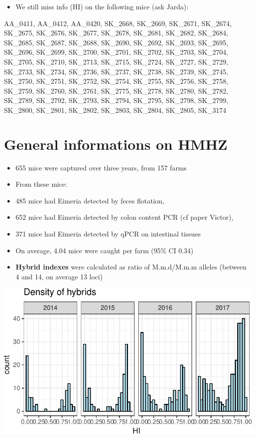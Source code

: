 \documentclass[]{article}
\providecommand{\tightlist}{%
  \setlength{\itemsep}{0pt}\setlength{\parskip}{0pt}}
\let\origfigure\figure
\let\endorigfigure\endfigure
\renewenvironment{figure}[1][2] { 
    \expandafter\origfigure\expandafter[H] 
} { 
    \endorigfigure 
}
\begin{document}
\begin{itemize}
\tightlist
\item
  We still miss info (HI) on the following mice (ask Jarda):
\end{itemize}

AA\_0411, AA\_0412, AA\_0420, SK\_2668, SK\_2669, SK\_2671, SK\_2674,
SK\_2675, SK\_2676, SK\_2677, SK\_2678, SK\_2681, SK\_2682, SK\_2684,
SK\_2685, SK\_2687, SK\_2688, SK\_2690, SK\_2692, SK\_2693, SK\_2695,
SK\_2696, SK\_2699, SK\_2700, SK\_2701, SK\_2702, SK\_2703, SK\_2704,
SK\_2705, SK\_2710, SK\_2713, SK\_2715, SK\_2724, SK\_2727, SK\_2729,
SK\_2733, SK\_2734, SK\_2736, SK\_2737, SK\_2738, SK\_2739, SK\_2745,
SK\_2750, SK\_2751, SK\_2752, SK\_2754, SK\_2755, SK\_2756, SK\_2758,
SK\_2759, SK\_2760, SK\_2761, SK\_2775, SK\_2778, SK\_2780, SK\_2782,
SK\_2789, SK\_2792, SK\_2793, SK\_2794, SK\_2795, SK\_2798, SK\_2799,
SK\_2800, SK\_2801, SK\_2802, SK\_2803, SK\_2804, SK\_2805, SK\_3174

\section{General informations on
HMHZ}\label{general-informations-on-hmhz}

\begin{itemize}
\item
  655 mice were captured over three years, from 157 farms
\item
  From these mice:
\item
  485 mice had Eimeria detected by feces flotation,
\item
  652 mice had Eimeria detected by colon content PCR (cf paper Victor),
\item
  371 mice had Eimeria detected by qPCR on intestinal tissues
\item
  On average, 4.04 mice were caught per farm (95\% CI 0.34)
\item
  \textbf{Hybrid indexes} were calculated as ratio of M.m.d/M.m.m
  alleles (between 4 and 14, on average 13 loci)
\end{itemize}

\begin{figure}[htbp]
\centering
\includegraphics{Data_Analysis_Alice_files/figure-latex/plotDensHI-1.pdf}
\caption{\label{fig:plot1}Number of animals caught along the hybrid
index}
\end{figure}
\end{document}
